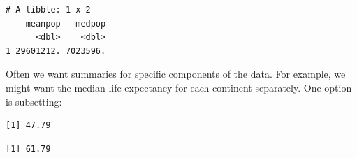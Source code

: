 \documentclass[]{krantz}
\makeatletter
\newenvironment{Shaded}{\begin{snugshade}}{\end{snugshade}}
\newcommand{\KeywordTok}[1]{\textcolor[rgb]{0.27,0.27,0.27}{\textbf{#1}}}
\newcommand{\DataTypeTok}[1]{\textcolor[rgb]{0.27,0.27,0.27}{#1}}
\newcommand{\StringTok}[1]{\textcolor[rgb]{0.5,0.5,0.5}{#1}}
\newcommand{\OperatorTok}[1]{\textcolor[rgb]{0.43,0.43,0.43}{\textbf{#1}}}
\newcommand{\ErrorTok}[1]{\textcolor[rgb]{0.14,0.14,0.14}{\textbf{#1}}}
\newcommand{\NormalTok}[1]{#1}
\newenvironment{kframe}{%
\medskip{}
\setlength{\fboxsep}{.8em}
 \def\at@end@of@kframe{}%
 \ifinner\ifhmode%
  \def\at@end@of@kframe{\end{minipage}}%
  \begin{minipage}{\columnwidth}%
 \fi\fi%
 \def\FrameCommand##1{\hskip\@totalleftmargin \hskip-\fboxsep
 \colorbox{shadecolor}{##1}\hskip-\fboxsep
     \hskip-\linewidth \hskip-\@totalleftmargin \hskip\columnwidth}%
 \MakeFramed {\advance\hsize-\width
   \@totalleftmargin\z@ \linewidth\hsize
   \@setminipage}}%
 {\par\unskip\endMakeFramed%
 \at@end@of@kframe}
\renewenvironment{Shaded}{\begin{kframe}}{\end{kframe}}
\makeatother
\begin{document}
\begin{Shaded}
\end{Shaded}

\begin{verbatim}
# A tibble: 1 x 2
    meanpop   medpop
      <dbl>    <dbl>
1 29601212. 7023596.
\end{verbatim}

Often we want summaries for specific components of the data. For
example, we might want the median life expectancy for each continent
separately. One option is subsetting:

\begin{Shaded}
\end{Shaded}

\begin{verbatim}
[1] 47.79
\end{verbatim}

\begin{Shaded}
\end{Shaded}

\begin{verbatim}
[1] 61.79
\end{verbatim}

\begin{Shaded}
\end{Shaded}
\end{document}
